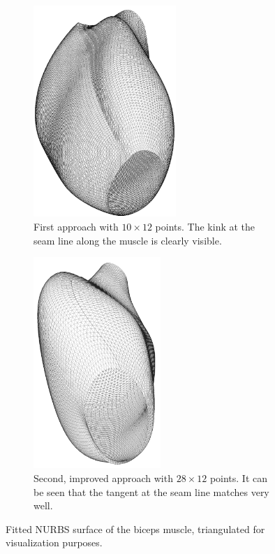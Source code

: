 \begin{figure}%
  \centering%
  \begin{subfigure}[t]{0.48\textwidth}%
    \centering%
    \includegraphics[height=8cm]{images/fiber_creation/splines_wrong00.png}%
    \caption{First approach with $10 \times 12$ points. The kink at the seam line along the muscle is clearly visible.}%
    \label{fig:biceps_splines_wrong}%
  \end{subfigure}
  \quad
  \begin{subfigure}[t]{0.48\textwidth}%
    \centering%
    \includegraphics[height=8cm]{images/fiber_creation/splines_seam00.png}%
    \caption{Second, improved approach with $28 \times 12$ points. It can be seen that the tangent at the seam line matches very well.}%
    \label{fig:biceps_splines_seam}%
  \end{subfigure}
  \caption{Fitted NURBS surface of the biceps muscle, triangulated for visualization purposes.}%
  \label{fig:biceps_splines}%
\end{figure}%
%
